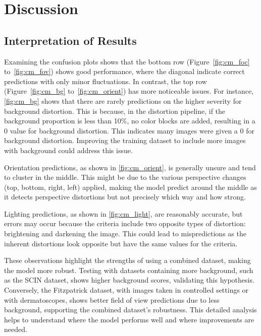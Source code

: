 \chapter{Discussion}
\label{ch:Discussion}

\section{Interpretation of Results}
\label{sec:InterpretationResults}
Examining the confusion plots shows that the bottom row (Figure~\ref{fig:cm_foc} to~\ref{fig:cm_fov}) shows good performance, where the diagonal indicate correct predictions with only minor fluctuations. In contrast, the top row (Figure~\ref{fig:cm_bg} to~\ref{fig:cm_orient}) has more noticeable issues. For instance, \autoref{fig:cm_bg} shows that there are rarely predictions on the higher severity for background distortion. This is because, in the distortion pipeline, if the background proportion is less than 10\%, no color blocks are added, resulting in a 0 value for background distortion. This indicates many images were given a 0 for background distortion. Improving the training dataset to include more images with background could address this issue. \par
\vspace{\baselineskip}
\noindent
Orientation predictions, as shown in \autoref{fig:cm_orient}, is generally unsure and tend to cluster in the middle. This might be due to the various perspective changes (top, bottom, right, left) applied, making the model predict around the middle as it detects perspective distortions but not precisely which way and how strong. \par
\vspace{\baselineskip}
\noindent
Lighting predictions, as shown in \autoref{fig:cm_light}, are reasonably accurate, but errors may occur because the criteria include two opposite types of distortion: brightening and darkening the image. This could lead to mispredictions as the inherent distortions look opposite but have the same values for the criteria. \par
\vspace{\baselineskip}
\noindent
These observations highlight the strengths of using a combined dataset, making the model more robust. Testing with datasets containing more background, such as the SCIN dataset, shows higher background scores, validating this hypothesis. Conversely, the Fitzpatrick dataset, with images taken in controlled settings or with dermatoscopes, shows better field of view predictions due to less background, supporting the combined dataset's robustness. This detailed analysis helps to understand where the model performs well and where improvements are needed. \par
